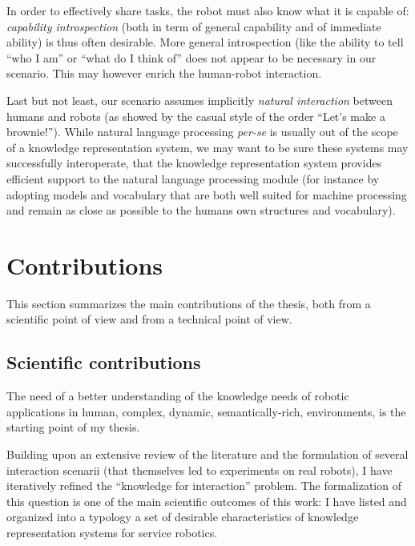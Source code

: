 In order to effectively share tasks, the robot must also know what it is
capable of: \emph{capability introspection} (both in term of general capability
and of immediate ability) is thus often desirable. More general introspection
(like the ability to tell ``who I am'' or ``what do I think of'' does not
appear to be necessary in our scenario. This may however enrich the human-robot
interaction.

Last but not least, our scenario assumes implicitly \emph{natural interaction}
between humans and robots (as showed by the casual style of the
order ``Let's make a brownie!''). While natural language processing {\it
per-se} is usually out of the scope of a knowledge representation system, we
may want to be sure these systems may successfully interoperate, \ie that the
knowledge representation system provides efficient support to the natural
language processing module (for instance by adopting models and vocabulary that
are both well suited for machine processing and remain as close as possible to
the humans own structures and vocabulary).



\section{Contributions}
\label{sect|contributions}

This section summarizes the main contributions of the thesis, both from a
scientific point of view and from a technical point of view.

\subsection{Scientific contributions}
\label{sect|scientific-contributions}

The need of a better understanding of the knowledge needs of robotic
applications in human, \ie complex, dynamic, semantically-rich, environments,
is the starting point of my thesis.

Building upon an extensive review of the literature and the formulation of
several interaction scenarii (that themselves led to experiments on real
robots), I have iteratively refined the ``knowledge for interaction'' problem.
The formalization of this question is one of the main scientific outcomes of
this work: I have listed and organized into a typology a set of desirable
characteristics of knowledge representation systems for service robotics.

